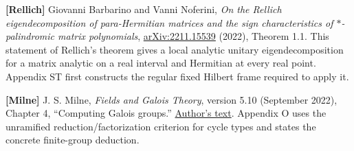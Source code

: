 \documentclass[a4paper,11pt]{article}
\numberwithin{equation}{section}
\begin{document}
\textbf{{[}Rellich{]}} Giovanni Barbarino and Vanni Noferini, \emph{On the Rellich eigendecomposition of para-Hermitian matrices and the sign characteristics of \(\ast\)-palindromic matrix polynomials}, \href{https://arxiv.org/abs/2211.15539}{arXiv:2211.15539} (2022), Theorem 1.1. This statement of Rellich's theorem gives a local analytic unitary eigendecomposition for a matrix analytic on a real interval and Hermitian at every real point. Appendix ST first constructs the regular fixed Hilbert frame required to apply it.

\textbf{{[}Milne{]}} J. S. Milne, \emph{Fields and Galois Theory}, version 5.10 (September 2022), Chapter 4, ``Computing Galois groups.'' \href{https://www.jmilne.org/math/CourseNotes/FT.pdf}{Author's text}. Appendix O uses the unramified reduction/factorization criterion for cycle types and states the concrete finite-group deduction.
\end{document}
